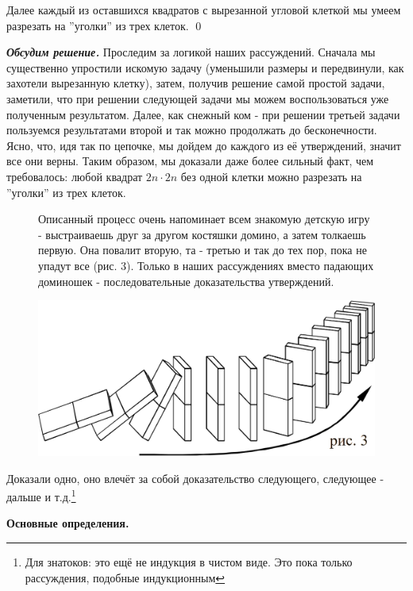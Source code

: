 Далее каждый из оставшихся квадратов с вырезанной угловой клеткой мы умеем разрезать на ''уголки'' из трех клеток. \qed

\textit{\textbf{Обсудим решение.}} Проследим за логикой наших рассуждений. Сначала мы существенно упростили искомую задачу (уменьшили размеры и передвинули, как захотели вырезанную клетку), затем, получив решение самой простой задачи, заметили, что при решении следующей задачи мы можем воспользоваться уже полученным результатом. Далее, как снежный ком - при решении третьей задачи пользуемся результатами второй и так можно продолжать до бесконечности. Ясно, что, идя так по цепочке, мы дойдем до каждого из её утверждений, значит все они верны. Таким образом, мы доказали даже более сильный факт, чем требовалось: любой квадрат $2n \cdot 2n$ без одной клетки можно разрезать на ''уголки'' из трех клеток.

{\setlength{\intextsep}{2pt}
\begin{figure}[h]
\begin{minipage}{0.45\linewidth}\setlength{\parindent}{1.5em}
Описанный процесс очень напоминает всем знакомую детскую игру - выстраиваешь друг за другом костяшки домино, а затем толкаешь первую. Она повалит вторую, та - третью и так до тех пор, пока не упадут все (рис. 3). Только в наших рассуждениях вместо падающих доминошек - последовательные доказательства утверждений. 
\end{minipage}
\hfill
\begin{minipage}{0.50\linewidth}
    \includegraphics[scale=0.32]{img/domino.png}
\end{minipage}
\end{figure}}
Доказали одно, оно влечёт за собой доказательство следующего, следующее - дальше и т.д.\footnote{Для знатоков: это ещё не индукция в чистом виде. Это пока только рассуждения, подобные индукционным}

\begin{center}
\textbf{Основные определения.}
\end{center}

